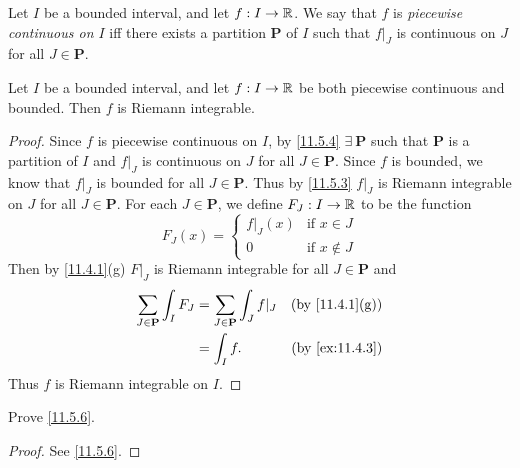\begin{defn}\label{11.5.4}
  Let \(I\) be a bounded interval, and let \(f : I \to \mathbb{R}\).
  We say that \(f\) is \emph{piecewise continuous on \(I\)} iff there exists a partition \(\mathbf{P}\) of \(I\) such that \(f|_J\) is continuous on \(J\) for all \(J \in \mathbf{P}\).
\end{defn}

\setcounter{thm}{5}
\begin{prop}\label{11.5.6}
  Let \(I\) be a bounded interval, and let \(f : I \to \mathbb{R}\) be both piecewise continuous and bounded.
  Then \(f\) is Riemann integrable.
\end{prop}

\begin{proof}
  Since \(f\) is piecewise continuous on \(I\), by \cref{11.5.4} \(\exists\ \mathbf{P}\) such that \(\mathbf{P}\) is a partition of \(I\) and \(f|_J\) is continuous on \(J\) for all \(J \in \mathbf{P}\).
  Since \(f\) is bounded, we know that \(f|_J\) is bounded for all \(J \in \mathbf{P}\).
  Thus by \cref{11.5.3} \(f|_J\) is Riemann integrable on \(J\) for all \(J \in \mathbf{P}\).
  For each \(J \in \mathbf{P}\), we define \(F_J : I \to \mathbb{R}\) to be the function
  \[
    F_J(x) = \begin{cases}
      f|_J(x) & \text{if } x \in J    \\
      0       & \text{if } x \notin J
    \end{cases}
  \]
  Then by \cref{11.4.1}(g) \(F|_J\) is Riemann integrable for all \(J \in \mathbf{P}\) and
  \begin{align*}
    \sum_{J \in \mathbf{P}} \int_I F_J & = \sum_{J \in \mathbf{P}} \int_J f|_J & \text{(by \cref{11.4.1}(g))} \\
                                       & = \int_I f.                           & \text{(by \cref{ex:11.4.3})}
  \end{align*}
  Thus \(f\) is Riemann integrable on \(I\).
\end{proof}

\exercisesection

\begin{ex}\label{ex:11.5.1}
  Prove \cref{11.5.6}.
\end{ex}

\begin{proof}
  See \cref{11.5.6}.
\end{proof}